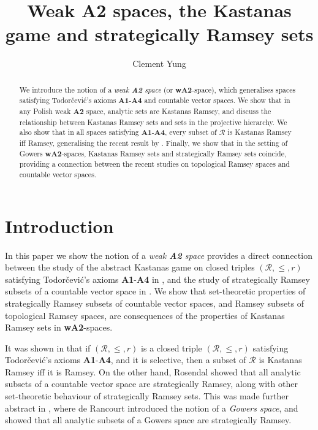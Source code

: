 \documentclass[11pt,reqno]{amsart}
\title[\textbf{\lowercase{w}A2}-spaces, the Kastanas game and strategically Ramsey sets]{Weak \textbf{A2} spaces, the Kastanas game and strategically Ramsey sets}
\author{Clement Yung}
\theoremstyle{plain}
\numberwithin{equation}{section}
\theoremstyle{definition}
\newcommand{\cal}{\mathcal}
\begin{document}
\begin{abstract}
    We introduce the notion of a \emph{weak \textbf{A2} space} (or \textbf{wA2}-space), which generalises spaces satisfying Todor\v{c}evi\'{c}'s axioms \textbf{A1}-\textbf{A4} and countable vector spaces. We show that in any Polish weak \textbf{A2} space, analytic sets are Kastanas Ramsey, and discuss the relationship between Kastanas Ramsey sets and sets in the projective hierarchy. We also show that in all spaces satisfying \textbf{A1}-\textbf{A4}, every subset of $\cal{R}$ is Kastanas Ramsey iff Ramsey, generalising the recent result by \cite{CD23}. Finally, we show that in the setting of Gowers \textbf{wA2}-spaces, Kastanas Ramsey sets and strategically Ramsey sets coincide, providing a connection between the recent studies on topological Ramsey spaces and countable vector spaces.
\end{abstract}

\maketitle

\section{Introduction}
In this paper we show the notion of a \emph{weak \textbf{A2} space} provides a direct connection between the study of the abstract Kastanas game on closed triples $(\cal{R},\leq,r)$ satisfying Todor\v{c}evi\'{c}'s axioms \textbf{A1}-\textbf{A4} in \cite{CD23}, and the study of strategically Ramsey subsets of a countable vector space in \cite{R08}. We show that set-theoretic properties of strategically Ramsey subsets of countable vector spaces, and Ramsey subsets of topological Ramsey spaces, are consequences of the properties of Kastanas Ramsey sets in \textbf{wA2}-spaces. 

It was shown in \cite{CD23} that if $(\cal{R},\leq,r)$ is a closed triple $(\cal{R},\leq,r)$ satisfying Todor\v{c}evi\'{c}'s axioms \textbf{A1}-\textbf{A4}, and it is selective, then a subset of $\cal{R}$ is Kastanas Ramsey iff it is Ramsey. On the other hand, Rosendal showed that all analytic subsets of a countable vector space are strategically Ramsey, along with other set-theoretic behaviour of strategically Ramsey sets. This was made further abstract in \cite{d20}, where de Rancourt introduced the notion of a \emph{Gowers space}, and showed that all analytic subsets of a Gowers space are strategically Ramsey.
\end{document}
